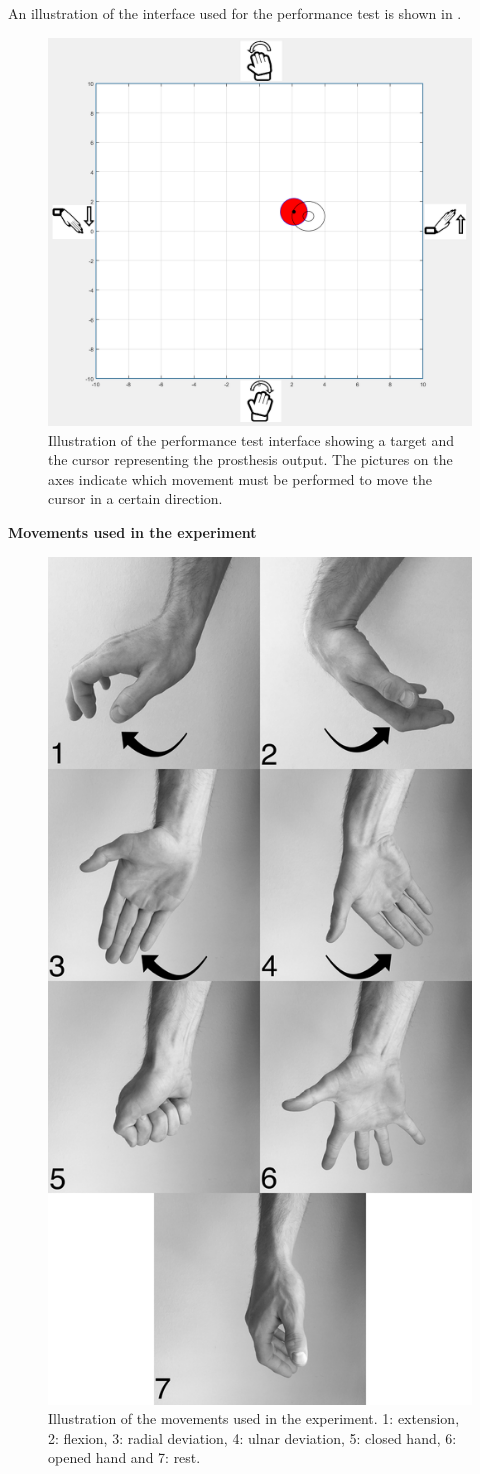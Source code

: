 An illustration of the interface used for the performance test is shown in .

\begin{figure}[H]                 
	\includegraphics[width=.6\textwidth]{figures/xBackground/perftestGUI}  
	\caption{Illustration of the performance test interface showing a target and the cursor representing the prosthesis output. The pictures on the axes indicate which movement must be performed to move the cursor in a certain direction.}
	\label{fig:perftestGUI} 
\end{figure}

\newpage
\textbf{\Large Movements used in the experiment}

\begin{figure}[H]                 
	\includegraphics[width=.6\textwidth]{figures/handGestures/BW/allHandMovementsVerticalBW}  
	\caption{Illustration of the movements used in the experiment. 1: extension, 2: flexion, 3: radial deviation, 4: ulnar deviation, 5: closed hand, 6: opened hand and 7: rest.}
	\label{fig:experiment_movements} 
\end{figure}

